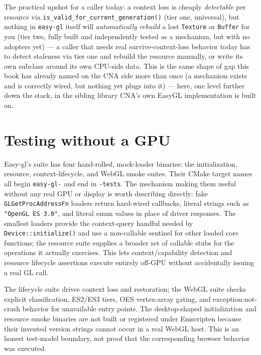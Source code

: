 The practical upshot for a caller today: a context loss is cheaply \emph{detectable} per
resource via \texttt{is\_valid\_for\_current\_generation()} (tier one, universal), but nothing
in \texttt{easy-gl} itself will \emph{automatically rebuild} a lost \texttt{Texture} or
\texttt{Buffer} for you (tier two, fully built and independently tested as a mechanism, but with
no adopters yet) --- a caller that needs real survive-context-loss behavior today has to detect
staleness via tier one and rebuild the resource manually, or write its own
 subclass around its own CPU-side data. This is the same shape of
gap this book has already named on the CNA side more than once (a mechanism exists and is
correctly wired, but nothing yet plugs into it) --- here, one level further down the stack, in
the sibling library CNA's own EasyGL implementation is built on.

\section{Testing without a GPU}

Easy-gl's suite has four hand-rolled, mock-loader binaries: the initialization, resource,
context-lifecycle, and WebGL smoke suites. Their CMake target names all begin
\texttt{easy-gl-} and end in \texttt{-tests}. The mechanism making them useful without any
real GPU or display is worth describing directly: fake \texttt{GLGetProcAddressFn} loaders
return hard-wired callbacks, literal strings such as \texttt{"OpenGL ES 3.0"}, and literal
enum values in place of driver responses. The smallest loaders provide the context-query
handful needed by \texttt{Device::initialize()} and use a non-callable sentinel for other
loaded core functions; the resource suite supplies a broader set of callable stubs for the
operations it actually exercises. This lets context/capability detection and resource
lifecycle assertions execute entirely off-GPU without accidentally issuing a real GL call.

The lifecycle suite drives context loss and restoration; the WebGL suite checks explicit
classification, ES2/ES3 tiers, OES vertex-array gating, and exception-not-crash behavior for
unavailable entry points. The desktop-shaped initialization and resource smoke binaries are
not built or registered under Emscripten because their invented version strings cannot occur
in a real WebGL host. This is an honest test-model boundary, not proof that the corresponding
browser behavior was executed.

